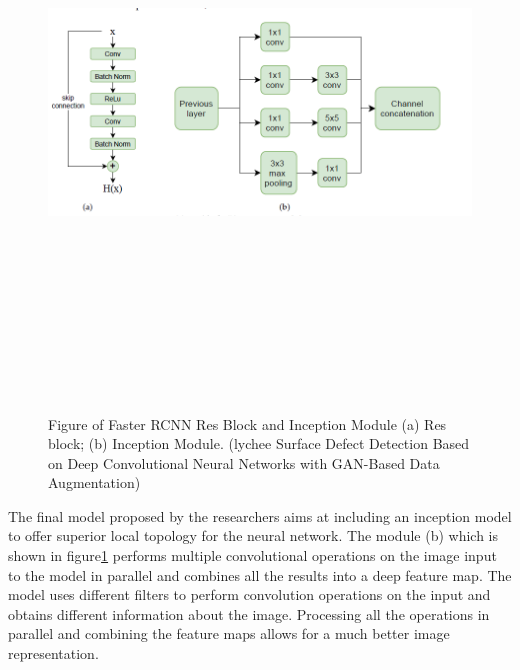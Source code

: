  \begin{figure}[H]
    \centering
    \includegraphics[width=1\textwidth,height=15cm,keepaspectratio]{Images/FasterRCNNResBlockInceptionModule.PNG}\\
    \caption{Figure of Faster RCNN Res Block and Inception Module (a) Res block; (b) Inception Module. (lychee Surface Defect Detection Based on Deep Convolutional Neural Networks with GAN-Based Data Augmentation)\cite{litReviewLychee}}
    \label{fig:Figure of Faster RCNN Res Block and Inception Module (lychee Surface Defect Detection Based on Deep Convolutional Neural Networks with GAN-Based Data Augmentation)}
\end{figure}
\vspace{0.5mm}
The final model proposed by the researchers aims at including an inception model to offer superior local topology for the neural network.  The module (b) which is shown in figure\ref{fig:Figure of Faster RCNN Res Block and Inception Module (lychee Surface Defect Detection Based on Deep Convolutional Neural Networks with GAN-Based Data Augmentation)} performs multiple convolutional operations on the image input to the model in parallel and combines all the results into a deep feature map.  The model uses different filters to perform convolution operations on the input and obtains different information about the image.  Processing all the operations in parallel and combining the feature maps allows for a much better image representation.
